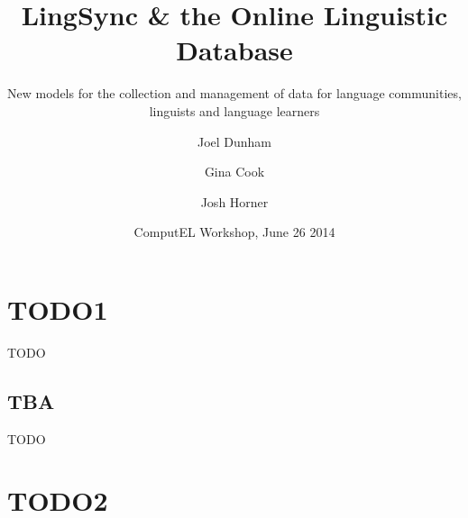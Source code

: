 \documentclass{beamer}
\begin{document}
\title[LingSync \& OLD] %
{LingSync \& the Online Linguistic Database}



\author[~]{Joel Dunham  \and Gina Cook  \and Josh Horner }
                 

\subtitle
{New models for the collection and management of data for language communities, linguists and
language learners}



\date[ComputEL 2014] %
{ComputEL Workshop, June 26 2014}





\begin{frame}
  \titlepage
\end{frame}

\section{TODO1}


\begin{frame}
TODO
\end{frame}

\subsection{TBA}

\begin{frame}
TODO
\end{frame}

\section{TODO2}
\end{document}
